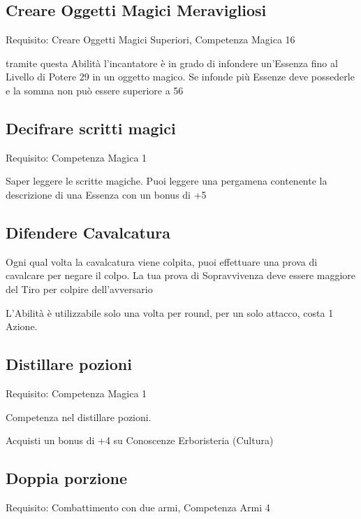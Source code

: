 \documentclass[a4paper,11pt,twoside,openany]{book}
\begin{document}
\subsection{Creare Oggetti Magici Meravigliosi}

Requisito: Creare Oggetti Magici Superiori, Competenza Magica 16

tramite questa Abilità l'incantatore è in grado di infondere un'Essenza fino al Livello di Potere 29 in un oggetto magico. Se infonde più Essenze deve possederle e la somma non può essere superiore a 56

\subsection{Decifrare scritti magici}

Requisito: Competenza Magica 1

Saper leggere le scritte magiche. Puoi leggere una pergamena contenente la descrizione di una Essenza con un bonus di +5

\subsection{Difendere Cavalcatura}

Ogni qual volta la cavalcatura viene colpita, puoi effettuare una prova di cavalcare per negare il colpo. La tua prova di Sopravvivenza deve essere maggiore del Tiro per colpire dell'avversario

L'Abilità è utilizzabile solo una volta per round, per un solo attacco, costa 1 Azione.

\subsection{Distillare pozioni}

Requisito: Competenza Magica 1

Competenza nel distillare pozioni.

Acquisti un bonus di +4 su Conoscenze Erboristeria (Cultura)

\subsection{Doppia porzione}

Requisito: Combattimento con due armi, Competenza Armi 4
\end{document}

